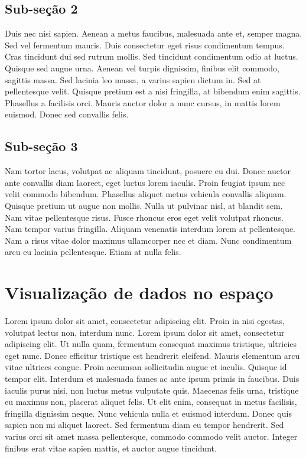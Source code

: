 \documentclass[]{book}
\begin{document}
\hypertarget{sub-seuxe7uxe3o-2-5}{%
\section{Sub-seção 2}\label{sub-seuxe7uxe3o-2-5}}

Duis nec nisi sapien. Aenean a metus faucibus, malesuada ante et, semper magna. Sed vel fermentum mauris. Duis consectetur eget risus condimentum tempus. Cras tincidunt dui sed rutrum mollis. Sed tincidunt condimentum odio at luctus. Quisque sed augue urna. Aenean vel turpis dignissim, finibus elit commodo, sagittis massa. Sed lacinia leo massa, a varius sapien dictum in. Sed at pellentesque velit. Quisque pretium est a nisi fringilla, at bibendum enim sagittis. Phasellus a facilisis orci. Mauris auctor dolor a nunc cursus, in mattis lorem euismod. Donec sed convallis felis.

\hypertarget{sub-seuxe7uxe3o-3-5}{%
\section{Sub-seção 3}\label{sub-seuxe7uxe3o-3-5}}

Nam tortor lacus, volutpat ac aliquam tincidunt, posuere eu dui. Donec auctor ante convallis diam laoreet, eget luctus lorem iaculis. Proin feugiat ipsum nec velit commodo bibendum. Phasellus aliquet metus vehicula convallis aliquam. Quisque pretium ut augue non mollis. Nulla ut pulvinar nisl, at blandit sem. Nam vitae pellentesque risus. Fusce rhoncus eros eget velit volutpat rhoncus. Nam tempor varius fringilla. Aliquam venenatis interdum lorem at pellentesque. Nam a risus vitae dolor maximus ullamcorper nec et diam. Nunc condimentum arcu eu lacinia pellentesque. Etiam at nulla felis.

\hypertarget{visualizauxe7uxe3o-de-dados-no-espauxe7o}{%
\chapter{Visualização de dados no espaço}\label{visualizauxe7uxe3o-de-dados-no-espauxe7o}}

Lorem ipsum dolor sit amet, consectetur adipiscing elit. Proin in nisi egestas, volutpat lectus non, interdum nunc. Lorem ipsum dolor sit amet, consectetur adipiscing elit. Ut nulla quam, fermentum consequat maximus tristique, ultricies eget nunc. Donec efficitur tristique est hendrerit eleifend. Mauris elementum arcu vitae ultrices congue. Proin accumsan sollicitudin augue et iaculis. Quisque id tempor elit. Interdum et malesuada fames ac ante ipsum primis in faucibus. Duis iaculis purus nisi, non luctus metus vulputate quis. Maecenas felis urna, tristique eu maximus non, placerat aliquet felis. Ut elit enim, consequat in metus facilisis, fringilla dignissim neque. Nunc vehicula nulla et euismod interdum. Donec quis sapien non mi aliquet laoreet. Sed fermentum diam eu tempor hendrerit. Sed varius orci sit amet massa pellentesque, commodo commodo velit auctor. Integer finibus erat vitae sapien mattis, et auctor augue tincidunt.
\end{document}
